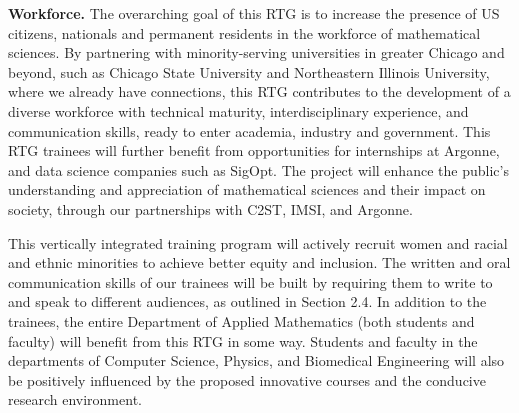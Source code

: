 \documentclass[11pt]{NSFamsart}
\begin{document}
{{\bf Workforce.}
The overarching goal of this RTG is to increase the presence of US citizens, nationals and permanent residents in the workforce of  mathematical sciences. 
By partnering with minority-serving  universities in greater Chicago and beyond, such as   Chicago State University and Northeastern Illinois University, where we already have connections, this RTG   contributes to  the development of a diverse    workforce with technical maturity, interdisciplinary experience, and communication skills, ready to enter academia, industry and government.
This RTG trainees will further benefit from %
 opportunities for internships at Argonne, %
and data science companies such as  SigOpt. The project will  enhance the public’s understanding and appreciation of mathematical sciences and their impact on  society, through our partnerships with C2ST, IMSI, and Argonne.  

This vertically integrated training program will actively recruit women  and racial and ethnic minorities to achieve better equity and inclusion.  The written and oral communication skills of our trainees will be built by requiring them to write to and speak to different audiences, as outlined in Section 2.4. 
In addition to the trainees, the entire Department of Applied Mathematics (both students and faculty) will benefit from this RTG in some way. Students and faculty in the departments of Computer Science, Physics, and Biomedical Engineering will also be positively influenced by the proposed innovative courses %
and the conducive research environment. 
 

}
\end{document}
